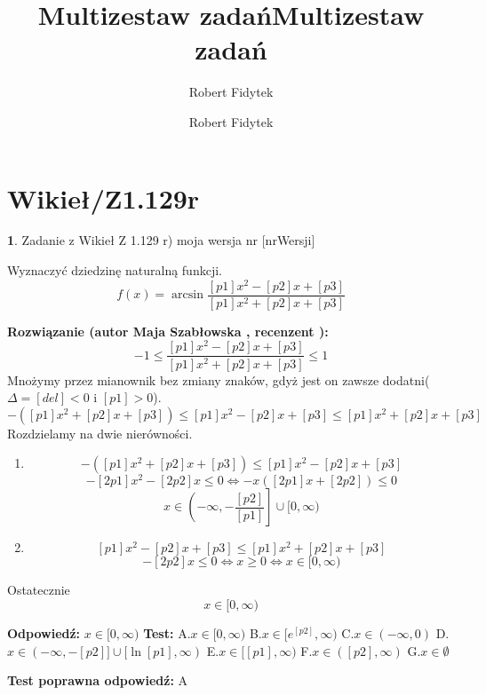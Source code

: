 \documentclass[12pt, a4paper]{article}
\title{Multizestaw zadań}
\author{Robert Fidytek}
\date{}\documentclass[12pt, a4paper]{article}
\title{Multizestaw zadań}
\author{Robert Fidytek}
\date{}
\theoremstyle{definition} %
\newtheorem{zad}{}
\theoremstyle{definition} %
\newtheorem{zad}{}
\newcommand{\kategoria}[1]{\section{#1}} %
\newcommand{\zadStart}[1]{\begin{zad}#1\newline} %
\newcommand{\zadStop}{\end{zad}}   %
\newcommand{\rozwStart}[2]{\noindent \textbf{Rozwiązanie (autor #1 , recenzent #2): }\newline} %
\newcommand{\rozwStop}{\newline}                                            %
\newcommand{\odpStart}{\noindent \textbf{Odpowiedź:}\newline}    %
\newcommand{\odpStop}{\newline}                                             %
\newcommand{\testStart}{\noindent \textbf{Test:}\newline} %
\newcommand{\testStop}{\newline} %
\newcommand{\kluczStart}{\noindent \textbf{Test poprawna odpowiedź:}\newline} %
\newcommand{\kluczStop}{\newline} %
\begin{document}
\maketitle


\kategoria{Wikieł/Z1.129r}
\zadStart{Zadanie z Wikieł Z 1.129 r) moja wersja nr [nrWersji]}



Wyznaczyć dziedzinę naturalną funkcji.
$$f(x)=\arcsin\frac{[p1]x^{2}-[p2]x+[p3]}{[p1]x^{2}+[p2]x+[p3]}$$
\zadStop

\rozwStart{Maja Szabłowska}{}
$$-1\leq\frac{[p1]x^{2}-[p2]x+[p3]}{[p1]x^{2}+[p2]x+[p3]}\leq 1$$
Mnożymy przez mianownik bez zmiany znaków, gdyż jest on zawsze dodatni($\Delta=[del]<0$ i $[p1]>0$).
$$-([p1]x^{2}+[p2]x+[p3])\leq[p1]x^{2}-[p2]x+[p3]\leq[p1]x^{2}+[p2]x+[p3]$$
Rozdzielamy na dwie nierówności.
\begin{enumerate}
    \item $$-([p1]x^{2}+[p2]x+[p3])\leq[p1]x^{2}-[p2]x+[p3]$$
$$-[2p1]x^{2}-[2p2]x\leq 0 \iff -x([2p1]x+[2p2])\leq 0$$
$$ x \in \left(-\infty, -\frac{[p2]}{[p1]}\right]\cup[0,\infty)$$
\item $$[p1]x^{2}-[p2]x+[p3]\leq[p1]x^{2}+[p2]x+[p3]$$
$$-[2p2]x\leq0 \iff x\geq0 \iff x\in[0,\infty)$$

\end{enumerate}
Ostatecznie 
$$x\in[0,\infty)$$

\rozwStop
\odpStart
$x\in[0,\infty)$
\odpStop
\testStart
A.$x\in[0,\infty)$
B.$x\in[e^{[p2]},\infty)$
C.$x\in(-\infty, 0)$
D.$x\in(-\infty, -[p2]] \cup [\ln[p1],\infty)$
E.$x\in[[p1],\infty)$
F.$x\in([p2],\infty)$
G.$x\in\emptyset$

\testStop
\kluczStart
A
\kluczStop
\end{document}
